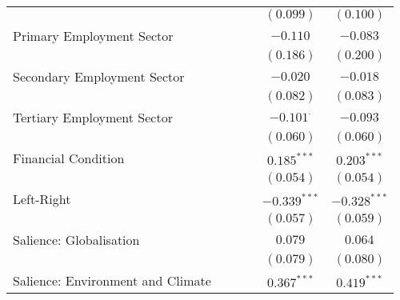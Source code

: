 \begin{center}
\begin{tiny}
\begin{longtable}{l@{} c@{} c@{} c@{} c@{} c@{}}
                                                      &                 &                  &                 & $(0.099)$        & $(0.100)$        \\
\quad Primary Employment Sector                       &                 &                  &                 & $-0.110$         & $-0.083$         \\
                                                      &                 &                  &                 & $(0.186)$        & $(0.200)$        \\
\quad Secondary Employment Sector                     &                 &                  &                 & $-0.020$         & $-0.018$         \\
                                                      &                 &                  &                 & $(0.082)$        & $(0.083)$        \\
\quad Tertiary Employment Sector                      &                 &                  &                 & $-0.101^{\cdot}$ & $-0.093$         \\
                                                      &                 &                  &                 & $(0.060)$        & $(0.060)$        \\
\quad Financial Condition                             &                 &                  &                 & $0.185^{***}$    & $0.203^{***}$    \\
                                                      &                 &                  &                 & $(0.054)$        & $(0.054)$        \\
\quad Left-Right                                      &                 &                  &                 & $-0.339^{***}$   & $-0.328^{***}$   \\
                                                      &                 &                  &                 & $(0.057)$        & $(0.059)$        \\
\quad Salience: Globalisation                         &                 &                  &                 & $0.079$          & $0.064$          \\
                                                      &                 &                  &                 & $(0.079)$        & $(0.080)$        \\
\quad Salience: Environment and Climate               &                 &                  &                 & $0.367^{***}$    & $0.419^{***}$    \\

\end{longtable}
\end{tiny}
\end{center}
